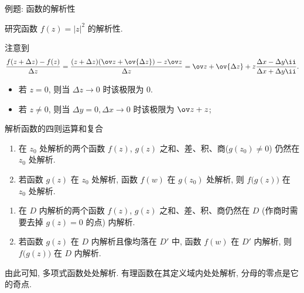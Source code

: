 \begin{frame}{例题: 函数的解析性}
	\onslide<+->
	\begin{example}[nearnext]
		研究函数 $f(z)=|z|^2$ 的解析性.
	\end{example}
	\onslide<+->
	\begin{solution}[nearprev]
		注意到
		\[
			\frac{f(z+\Delta z)-f(z)}{\Delta z}
			=\frac{(z+\Delta z)(\ov z+\ov{\Delta z})-z\ov z}{\Delta z}
			=\ov z+\ov{\Delta z}+z\frac{\Delta x-\Delta y\ii}{\Delta x+\Delta y\ii}.
		\]
		\begin{itemize}
			\item 若 $z=0$, 则当 $\Delta z\to 0$ 时该极限为 $0$.
			\item 若 $z\neq0$, 则当 $\Delta y=0,\Delta x\to 0$ 时该极限为 $\ov z+z$;
		\end{itemize}
	\end{solution}
\end{frame}


\begin{frame}{解析函数的四则运算和复合}
	\onslide<+->
	\begin{theorem}
		\begin{enumerate}
			\item 在 $z_0$ 处解析的两个函数 $f(z)$, $g(z)$ 之和、差、积、商($g(z_0)\neq 0$) 仍然在 $z_0$ 处解析.
			\item 若函数 $g(z)$ 在 $z_0$ 处解析, 函数 $f(w)$ 在 $g(z_0)$ 处解析, 则 $f\bigl(g(z)\bigr)$ 在 $z_0$ 处解析.
		\end{enumerate}
	\end{theorem}
	\onslide<+->
	\begin{theorem}
		\begin{enumerate}
			\item 在 $D$ 内解析的两个函数 $f(z)$, $g(z)$ 之和、差、积、商仍然在 $D$ (作商时需要去掉 $g(z)=0$ 的点) 内解析.
			\item 若函数 $g(z)$ 在 $D$ 内解析且像均落在 $D'$ 中, 函数 $f(w)$ 在 $D'$ 内解析, 则 $f\bigl(g(z)\bigr)$ 在 $D$ 内解析.
		\end{enumerate}
	\end{theorem}
	\onslide<+->
	由此可知, 多项式函数处处解析. 有理函数在其定义域内处处解析, 分母的零点是它的奇点.
\end{frame}


